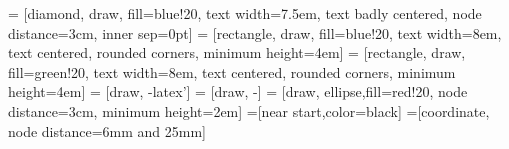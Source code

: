 \documentclass[10pt, conference, compsocconf]{IEEEtran}  %
\numberwithin{Definition}{section}
\numberwithin{Claim}{section}
\begin{document}


 = [diamond, draw, fill=blue!20, 
    text width=7.5em, text badly centered, node distance=3cm, inner sep=0pt]
 = [rectangle, draw, fill=blue!20, 
    text width=8em, text centered, rounded corners, minimum height=4em]
 = [rectangle, draw, fill=green!20, 
    text width=8em, text centered, rounded corners, minimum height=4em]
 = [draw, -latex']
 = [draw, -]
 = [draw, ellipse,fill=red!20, node distance=3cm,
    minimum height=2em]
=[near start,color=black]
=[coordinate, node distance=6mm and 25mm]
\end{document}
